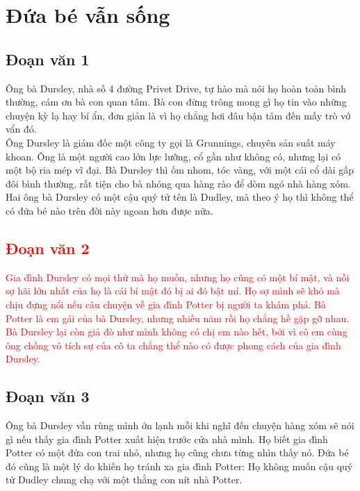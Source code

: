 \documentclass[a4paper, 12pt]{report}
\begin{document}
\setcounter{page}{0}

\tableofcontents

\newpage
\pagecolor[HTML]{f5f5d6}

\chapter{Đứa bé vẫn sống}
\section{Đoạn văn 1}
{\fontsize{20pt}{25pt}
\selectfont
Ông bà Dursley, nhà số 4 đường Privet Drive, tự hào mà nói họ hoàn toàn bình thường, cám ơn bà con quan tâm. Bà con đừng trông mong gì họ tin vào những chuyện kỳ lạ hay bí ẩn, đơn giản là vì họ chẳng hơi đâu bận tâm đến mấy trò vớ vẩn đó.}\\

Ông Dursley là giám đốc một công ty gọi là Grunnings, chuyên sản suất máy khoan. Ông là một người cao lớn lực lưỡng, cổ gần như không có, nhưng lại có một bộ ria mép vĩ đại. Bà Dursley thì ốm nhom, tóc vàng, với một cái cổ dài gấp đôi bình thường, rất tiện cho bà nhóng qua hàng rào để dòm ngó nhà hàng xóm. Hai ông bà Dursley có một cậu quý tử tên là Dudley, mà theo ý họ thì không thể có đứa bé nào trên đời này ngoan hơn được nữa.

\textcolor{red}{
\section{Đoạn văn 2}
Gia đình Dursley có mọi thứ mà họ muốn, nhưng họ cũng có một bí mật, và
nỗi sợ hãi lớn nhất của họ là cái bí mật đó bị ai đó bật mí. Họ sợ mình sẽ
khó mà chịu đựng nổi nếu câu chuyện về gia đình Potter bị người ta khám phá.
Bà Potter là em gái của bà Dursley, nhưng nhiều năm rồi họ chẳng hề gặp gỡ
nhau. Bà Dursley lại còn giả đò như mình không có chị em nào hết, bởi vì cô
em cùng ông chồng vô tích sự của cô ta chẳng thể nào có được phong cách của
gia đình Dursley.
}

\section*{Đoạn văn 3}
Ông bà Dursley vẫn rùng mình ớn lạnh mỗi khi nghĩ đến chuyện hàng xóm sẽ
nói gì nếu thấy gia đình Potter xuất hiện trước cửa nhà mình. Họ biết gia đình
Potter có một đứa con trai nhỏ, nhưng họ cũng chưa từng nhìn thấy nó. Đứa bé
đó cũng là một lý do khiến họ tránh xa gia đình Potter: Họ không muốn cậu quý
tử Dudley chung chạ với một thằng con nít nhà Potter.
\end{document}

